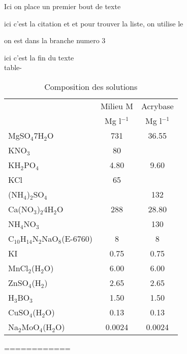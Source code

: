 \documentclass{sn-jnl}%
\begin{document}
Ici on place un premier bout de texte

	ici c'est la citation  
			\cite{declerck_vitro_2005}et  \cite{fortin_arbuscular_2002}et pour trouver la liste, \cite{silvani_novel_2019}on utilise le 

on est dans la branche numero 3

ici c'est la fin du texte\\

table-


\begin{table}[h]
	\caption{Composition des solutions}
	\begin{tabular}{@{}lSS@{}}
		\toprule
		 & {Milieu M} & {Acrybase}\\
		  & {Mg l$ ^{-1} $} &{Mg l$ ^{-1} $} \\
		\midrule
		 {MgSO$ _{4} $\textperiodcentered 7H$ _{2} $O}& 731 & 36.55 \\
		{KNO$ _{3} $} & 80 &  \\
		{KH$ _{2} $PO$ _{4} $} & 4.80 & 9.60\\
		{KCl} & 65 & \\
		{(NH$ _{4} $)$ _{2} $SO$ _{4} $} & & 132\\
		{Ca(NO$ _{3} $)$ _{2} $\textperiodcentered 4H$ _{2} $O} & 288 & 28.80 \\
		{NH$ _{4} $NO$ _{3} $} & & 130\\
		\midrule
		{C$ _{10} $H$ _{14} $N$ _{2} $NaO$ _{8} $(E-6760)} & 8 & 8 \\
		KI &0.75 & 0.75 \\
		{MnCl$ _{2} $(H$ _{2} $O)} & 6.00& 6.00 \\
			{ZnSO$ _{4} $(H$ _{2} $)} & 2.65& 2.65\\
			{H$ _{3} $BO$ _{3} $} & 1.50 & 1.50 \\
			{CuSO$ _{4} $(H$ _{2} $O)} & 0.13& 0.13\\
			 {Na$ _{2} $MoO$ _{4} $(H$ _{2} $O)}& 0.0024 & 0.0024 \\
		\bottomrule
	\end{tabular}

	
\end{table}





============%

\end{document}
